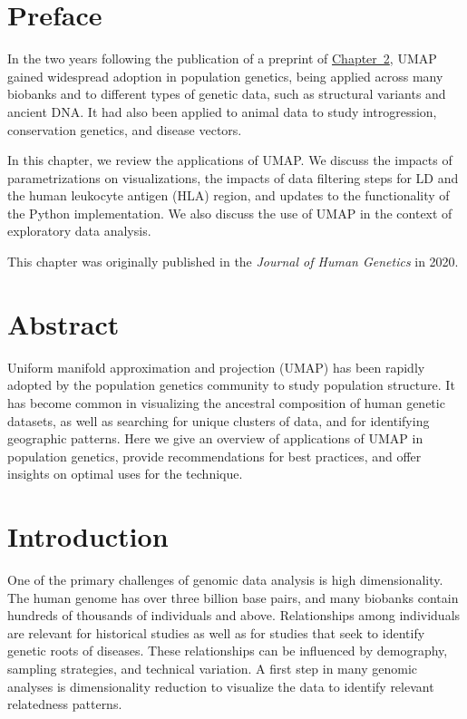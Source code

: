 \setcounter{section}{-1}

\section{Preface}

In the two years following the publication of a preprint of \hyperref[chap:chapter1]{Chapter~2}, UMAP gained widespread adoption in population genetics, being applied across many biobanks and to different types of genetic data, such as structural variants and ancient DNA. It had also been applied to animal data to study introgression, conservation genetics, and disease vectors.

In this chapter, we review the applications of UMAP. We discuss the impacts of parametrizations on visualizations, the impacts of data filtering steps for LD and the human leukocyte antigen (HLA) region, and updates to the functionality of the Python implementation. We also discuss the use of UMAP in the context of exploratory data analysis.

This chapter was originally published in the \textit{Journal of Human Genetics} in 2020.

\clearpage

\section{Abstract}

Uniform manifold approximation and projection (UMAP) has been rapidly adopted by the population genetics community to study population structure. It has become common in visualizing the ancestral composition of human genetic datasets, as well as searching for unique clusters of data, and for identifying geographic patterns. Here we give an overview of applications of UMAP in population genetics, provide recommendations for best practices, and offer insights on optimal uses for the technique.

\section{Introduction}
One of the primary challenges of genomic data analysis is high dimensionality. The human genome has over three billion base pairs, and many biobanks contain hundreds of thousands of individuals and above. Relationships among individuals are relevant for historical studies as well as for studies that seek to identify genetic roots of diseases. These relationships can be influenced by demography, sampling strategies, and technical variation. A first step in many genomic analyses is dimensionality reduction to visualize the data to identify relevant relatedness patterns. 

